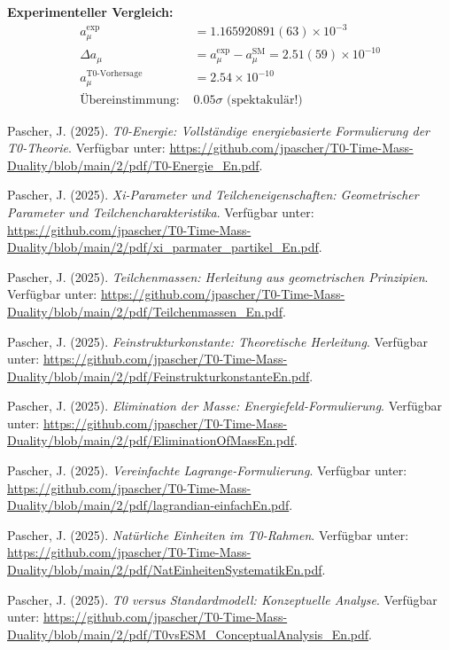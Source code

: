 \documentclass[12pt,a4paper]{article}
\numberwithin{equation}{section}
\begin{document}
	\textbf{Experimenteller Vergleich:}
	\begin{align}
		a_\mu^{\exp} &= 1.165920891(63) \times 10^{-3}\\
		\Delta a_\mu &= a_\mu^{\exp} - a_\mu^{\text{SM}} = 2.51(59) \times 10^{-10}\\
		a_\mu^{\text{T0-Vorhersage}} &= 2.54 \times 10^{-10}\\
		\text{Übereinstimmung: } &0.05\sigma \text{ (spektakulär!)}
		\label{eq:muon_comparison}
	\end{align}
	
	\begin{thebibliography}{99}
		
		Pascher, J. (2025). \emph{T0-Energie: Vollständige energiebasierte Formulierung der T0-Theorie}. Verfügbar unter: \url{https://github.com/jpascher/T0-Time-Mass-Duality/blob/main/2/pdf/T0-Energie_En.pdf}.
		
		Pascher, J. (2025). \emph{Xi-Parameter und Teilcheneigenschaften: Geometrischer Parameter und Teilchencharakteristika}. Verfügbar unter: \url{https://github.com/jpascher/T0-Time-Mass-Duality/blob/main/2/pdf/xi_parmater_partikel_En.pdf}.
		
		Pascher, J. (2025). \emph{Teilchenmassen: Herleitung aus geometrischen Prinzipien}. Verfügbar unter: \url{https://github.com/jpascher/T0-Time-Mass-Duality/blob/main/2/pdf/Teilchenmassen_En.pdf}.
		
		Pascher, J. (2025). \emph{Feinstrukturkonstante: Theoretische Herleitung}. Verfügbar unter: \url{https://github.com/jpascher/T0-Time-Mass-Duality/blob/main/2/pdf/FeinstrukturkonstanteEn.pdf}.
		
		Pascher, J. (2025). \emph{Elimination der Masse: Energiefeld-Formulierung}. Verfügbar unter: \url{https://github.com/jpascher/T0-Time-Mass-Duality/blob/main/2/pdf/EliminationOfMassEn.pdf}.
		
		Pascher, J. (2025). \emph{Vereinfachte Lagrange-Formulierung}. Verfügbar unter: \url{https://github.com/jpascher/T0-Time-Mass-Duality/blob/main/2/pdf/lagrandian-einfachEn.pdf}.
		
		Pascher, J. (2025). \emph{Natürliche Einheiten im T0-Rahmen}. Verfügbar unter: \url{https://github.com/jpascher/T0-Time-Mass-Duality/blob/main/2/pdf/NatEinheitenSystematikEn.pdf}.
		
		Pascher, J. (2025). \emph{T0 versus Standardmodell: Konzeptuelle Analyse}. Verfügbar unter: \url{https://github.com/jpascher/T0-Time-Mass-Duality/blob/main/2/pdf/T0vsESM_ConceptualAnalysis_En.pdf}.
		

\end{thebibliography}
\end{document}
